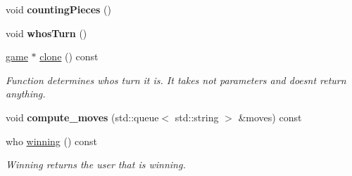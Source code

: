 \begin{DoxyCompactItemize}
\item 
void {\bfseries counting\+Pieces} ()\hypertarget{classmain__savitch__14_1_1Othello_a19f49edfbe82b84922877e00bc854ed8}{}\label{classmain__savitch__14_1_1Othello_a19f49edfbe82b84922877e00bc854ed8}

\item 
void {\bfseries whos\+Turn} ()\hypertarget{classmain__savitch__14_1_1Othello_a21440dbb4511812a76c578a5f546710b}{}\label{classmain__savitch__14_1_1Othello_a21440dbb4511812a76c578a5f546710b}

\item 
\hyperlink{classmain__savitch__14_1_1game}{game} $\ast$ \hyperlink{classmain__savitch__14_1_1Othello_ab5a505f8a6ffd860376bf074c57e8a5f}{clone} () const \hypertarget{classmain__savitch__14_1_1Othello_ab5a505f8a6ffd860376bf074c57e8a5f}{}\label{classmain__savitch__14_1_1Othello_ab5a505f8a6ffd860376bf074c57e8a5f}

\begin{DoxyCompactList}\small\item\em Function determines whos turn it is. It takes not parameters and doesn\textquotesingle{}t return anything. \end{DoxyCompactList}\item 
void {\bfseries compute\+\_\+moves} (std\+::queue$<$ std\+::string $>$ \&moves) const \hypertarget{classmain__savitch__14_1_1Othello_aae15562565348c574b8e4c0b7782d19f}{}\label{classmain__savitch__14_1_1Othello_aae15562565348c574b8e4c0b7782d19f}

\item 
who \hyperlink{classmain__savitch__14_1_1Othello_a8934d1b63f73c03dae9629dbe03955d7}{winning} () const 
\begin{DoxyCompactList}\small\item\em Winning returns the user that is winning. \end{DoxyCompactList}\end{DoxyCompactItemize}
